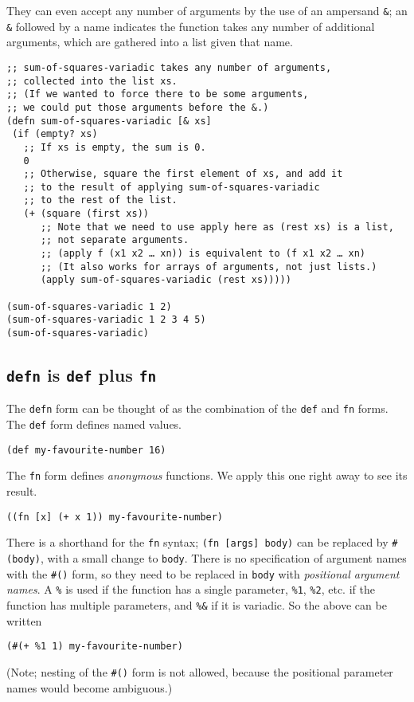 \documentclass[11pt]{article}
\begin{document}
They can even accept any number of arguments
by the use of an ampersand \texttt{\&}; an \texttt{\&} followed by a name
indicates the function takes any number of additional arguments,
which are gathered into a list given that name.
\begin{verbatim}
;; sum-of-squares-variadic takes any number of arguments,
;; collected into the list xs.
;; (If we wanted to force there to be some arguments,
;; we could put those arguments before the &.)
(defn sum-of-squares-variadic [& xs]
 (if (empty? xs)
   ;; If xs is empty, the sum is 0.
   0
   ;; Otherwise, square the first element of xs, and add it
   ;; to the result of applying sum-of-squares-variadic
   ;; to the rest of the list.
   (+ (square (first xs))
      ;; Note that we need to use apply here as (rest xs) is a list,
      ;; not separate arguments.
      ;; (apply f (x1 x2 … xn)) is equivalent to (f x1 x2 … xn)
      ;; (It also works for arrays of arguments, not just lists.)
      (apply sum-of-squares-variadic (rest xs)))))

(sum-of-squares-variadic 1 2)
(sum-of-squares-variadic 1 2 3 4 5)
(sum-of-squares-variadic)
\end{verbatim}

\subsection{\texttt{defn} is \texttt{def} plus \texttt{fn}}
\label{sec:org3c0e22f}
The \texttt{defn} form can be thought of
as the combination of the \texttt{def} and \texttt{fn} forms.
The \texttt{def} form defines named values.
\begin{verbatim}
(def my-favourite-number 16)
\end{verbatim}

The \texttt{fn} form defines \emph{anonymous} functions.
We apply this one right away to see its result.
\begin{verbatim}
((fn [x] (+ x 1)) my-favourite-number)
\end{verbatim}

There is a shorthand for the \texttt{fn} syntax; \texttt{(fn [args] body)} can be
replaced by \texttt{\#(body)}, with a small change to \texttt{body}.
There is no specification of argument names with the \texttt{\#()} form,
so they need to be replaced in \texttt{body} with \emph{positional argument names}.
A \texttt{\%} is used if the function has a single parameter, \texttt{\%1}, \texttt{\%2}, etc.
if the function has multiple parameters, and \texttt{\%\&} if it is variadic.
So the above can be written
\begin{verbatim}
(#(+ %1 1) my-favourite-number)
\end{verbatim}
(Note; nesting of the \texttt{\#()} form is not allowed, because the
positional parameter names would become ambiguous.)
\end{document}

